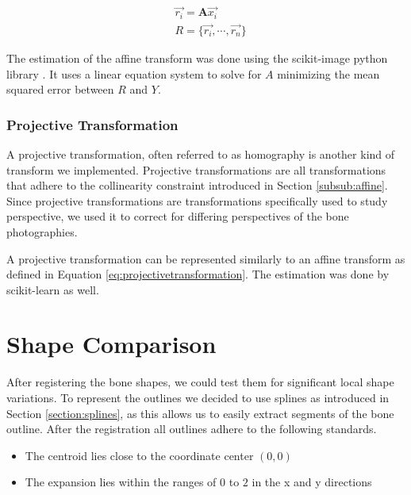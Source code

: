 \documentclass[pdftex,12pt,a4paper]{report}
\begin{document}
\begin{equation}
\label{eq:projectivetransformation}
\begin{split}
& \vec{r_i} = \mathbf{A} \vec{x_i} \\
& R = \{ \vec{r_i}, \cdots, \vec{r_n} \}
\end{split}
\end{equation}

The estimation of the affine transform was done using the scikit-image python library \cite{van2014scikit}.
It uses a linear equation system to solve for $A$ minimizing the mean squared error between $R$ and $Y$.

\subsubsection{Projective Transformation}

A projective transformation, often referred to as homography is another kind of transform we implemented.
Projective transformations are all transformations that adhere to the collinearity constraint introduced
in Section \ref{subsub:affine}. Since projective transformations are transformations specifically used
to study perspective, we used it to correct for differing perspectives of the bone photographies.

A projective transformation can be represented similarly to an affine transform as defined in Equation
\ref{eq:projectivetransformation}. The estimation was done by scikit-learn \cite{van2014scikit} as well. 

\section{Shape Comparison}
\label{sec:shape-comparison}

After registering the bone shapes, we could test them for significant local shape variations.
To represent the outlines we decided to use splines as introduced in Section \ref{section:splines},
as this allows us to easily extract segments of the bone outline. After the registration all outlines
adhere to the following standards.

\begin{itemize}
\item The centroid lies close to the coordinate center $(0,0)$
\item The expansion lies within the ranges of $0$ to $2$ in the x and y directions
\end{itemize}
\end{document}
